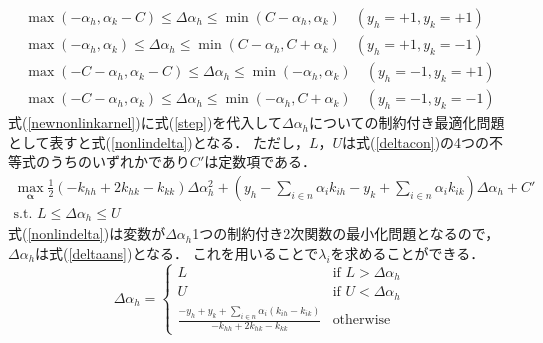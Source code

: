 \documentclass[11pt,a4paper,titlepage]{ltjsarticle}
\begin{document}
\begin{equation}
    \label{deltacon}
    \begin{gathered}
        \max(-\alpha_h,\alpha_k-C) \leq \Delta\alpha_h \leq \min(C-\alpha_h,\alpha_k)\quad(y_h=+1,y_k=+1)\\
        \max(-\alpha_h,\alpha_k) \leq \Delta\alpha_h \leq \min(C-\alpha_h,C+\alpha_k)\quad(y_h=+1,y_k=-1)\\
        \max(-C-\alpha_h,\alpha_k-C) \leq \Delta\alpha_h \leq \min(-\alpha_h,\alpha_k)\quad(y_h=-1,y_k=+1)\\
        \max(-C-\alpha_h,\alpha_k) \leq \Delta\alpha_h \leq \min(-\alpha_h,C+ \alpha_k)\quad(y_h=-1,y_k=-1)
    \end{gathered}
\end{equation}
式(\ref{newnonlinkarnel})に式(\ref{step})を代入して$\Delta\alpha_h$についての制約付き最適化問題として表すと式(\ref{nonlindelta})となる．
ただし，$L$，$U$は式(\ref{deltacon})の4つの不等式のうちのいずれかであり$C'$は定数項である．
\begin{equation}
    \label{nonlindelta}
    \begin{gathered}
        \max_{\bm{\alpha}}\frac{1}{2}(-k_{hh} + 2k_{hk} - k_{kk})\Delta\alpha_h^2+\left(y_h-\sum_{i\in n}\alpha_ik_{ih} - y_k + \sum_{i \in n}\alpha_ik_{ik}\right)\Delta\alpha_h + C'\\
        \text{s.t. } L \leq \Delta\alpha_h \leq U
    \end{gathered}
\end{equation}
式(\ref{nonlindelta})は変数が$\Delta\alpha_h$1つの制約付き2次関数の最小化問題となるので，$\Delta\alpha_h$は式(\ref{deltaans})となる．
これを用いることで$\lambda_i$を求めることができる．
\begin{equation}
    \label{deltaans}
    \Delta\alpha_h =
    \begin{cases}
        \displaystyle L & \text{if } L > \Delta\alpha_h \\
        \displaystyle U & \text{if } U < \Delta\alpha_h \\
        \displaystyle \frac{-y_h + y_k + \sum_{i\in n}\alpha_i(k_{ih} - k_{ik})}{-k_{hh} + 2k_{hk} - k_{kk}} & \text{otherwise}
    \end{cases}
\end{equation}
\end{document}
